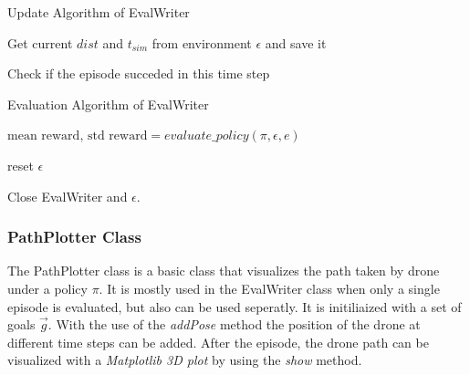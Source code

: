 \begin{algorithm}
	\caption{Update Algorithm of EvalWriter}
	\label{alg:upd}
	Get current $dist$ and $t_{sim}$ from environment $\epsilon$ and save it
	
		
		
	
	
	Check if the episode succeded in this time step
\end{algorithm}

\newpage

\begin{algorithm}
	\caption{Evaluation Algorithm of EvalWriter}
	\label{alg:evalwriter}
	
	$\text{mean reward, std reward} = evaluate\_policy (\pi , \epsilon, e)$
	
	reset $\epsilon$
	
	Close EvalWriter and $\epsilon$.
\end{algorithm} 

\subsubsection{PathPlotter Class}
The PathPlotter class is a basic class that visualizes the path taken by drone under a policy $\pi$. It is mostly used in the EvalWriter class when only a single episode is evaluated, but also can be used seperatly. It is initiliaized with a set of goals $\overrightarrow{g}$. With the use of the \emph{addPose} method the position of the drone at different time steps can be added. After the episode, the drone path can be visualized with a \emph{Matplotlib 3D plot} by using the \emph{show} method.
